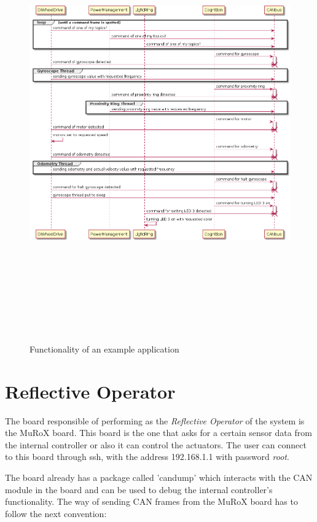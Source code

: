 \documentclass[12pt]{report}%
\begin{document}
\begin{figure}[ht]
 \centering
 \caption{Functionality of an example application}
 \includegraphics[width=\textwidth, height=18cm]{sequence_overall}
		\label{fig:seqoverall}
\end{figure}

\chapter{Reflective Operator}
\label{chap:reflective}
The board responsible of performing as the \textit{Reflective Operator} of the system is the MuRoX board. This board is the one that asks for a certain sensor data from the internal controller or also it can control the actuators. The user can connect to this board through ssh, with the address 192.168.1.1 with password \textit{root}.

The board already has a package called 'candump' which interacts with the CAN module in the board and can be used to debug the internal controller's functionality. The way of sending CAN frames from the MuRoX board has to follow the next convention:
\end{document}
